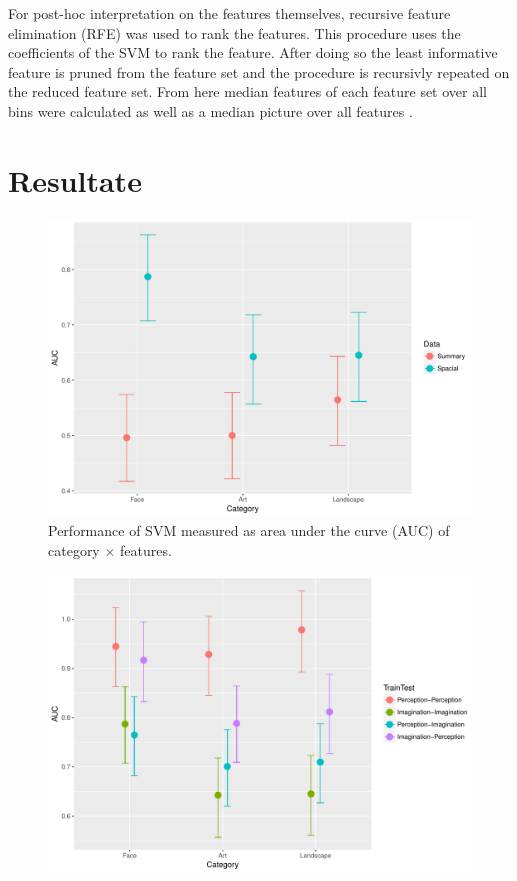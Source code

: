 \documentclass[a4paper,man,natbib,floatsintext]{apa6}
\begin{document}
For post-hoc interpretation on the features themselves, recursive feature elimination (RFE) was used to rank the features. This procedure uses the coefficients of the SVM to rank the feature. After doing so the least informative feature is pruned from the feature set and the procedure is recursivly repeated on the reduced feature set. 
From here median features of each feature set over all bins were calculated as well as a median picture over all features \citep{Pedregosa2012a}. \\

\section{Resultate}
\begin{figure}
\centering
\includegraphics[width=1\textwidth]{CategoryXFeature.pdf}
\caption[Category $\times$ Features]{\label{fig:CategoryXFeature} Performance of SVM measured as area under the curve (AUC) of category $\times$ features.}
\end{figure}
\begin{figure}
\centering
\includegraphics[width=1\textwidth]{CategoryXTrainTest.pdf}
\caption[Category $\times$ Training-Test-Condition]{\label{fig:CategoryXTrainTest} }
\end{figure}
\end{document}
